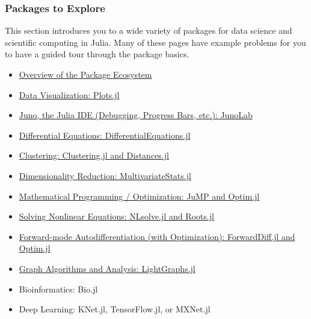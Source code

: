 \documentclass[11pt]{article}
\begin{document}
\subsubsection{Packages to Explore}\label{packages-to-explore}

This section introduces you to a wide variety of packages for data
science and scientific computing in Julia. Many of these pages have
example problems for you to have a guided tour through the package
basics.

\begin{itemize}
\itemsep1pt\parskip0pt
\item
  \href{http://ucidatascienceinitiative.github.io/IntroToJulia/Html/PackageEcosystem}{Overview
  of the Package Ecosystem}
\item
  \href{http://ucidatascienceinitiative.github.io/IntroToJulia/Html/PlotsJL}{Data
  Visualization: Plots.jl}
\item
  \href{https://chrisrackauckas.github.io/JunoDocs.jl/latest/}{Juno, the
  Julia IDE (Debugging, Progress Bars, etc.): JunoLab}
\item
  \href{http://ucidatascienceinitiative.github.io/IntroToJulia/Html/DiffEq}{Differential
  Equations: DifferentialEquations.jl}
\item
  \href{http://ucidatascienceinitiative.github.io/IntroToJulia/Html/Clustering}{Clustering:
  Clustering.jl and Distances.jl}
\item
  \href{http://ucidatascienceinitiative.github.io/IntroToJulia/Html/DimensionalityReduction}{Dimensionality
  Reduction: MultivariateStats.jl}
\item
  \href{http://ucidatascienceinitiative.github.io/IntroToJulia/Html/Optimization}{Mathematical
  Programming / Optimization: JuMP and Optim.jl}
\item
  \href{http://ucidatascienceinitiative.github.io/IntroToJulia/Html/NonlinearSolve}{Solving
  Nonlinear Equations: NLsolve.jl and Roots.jl}
\item
  \href{http://ucidatascienceinitiative.github.io/IntroToJulia/Html/ForwardDiff}{Forward-mode
  Autodifferentiation (with Optimization): ForwardDiff.jl and Optim.jl}
\item
  \href{http://ucidatascienceinitiative.github.io/IntroToJulia/Html/Graphs}{Graph
  Algorithms and Analysis: LightGraphs.jl}
\item
  Bioinformatics: Bio.jl
\item
  Deep Learning: KNet.jl, TensorFlow.jl, or MXNet.jl
\end{itemize}
\end{document}
